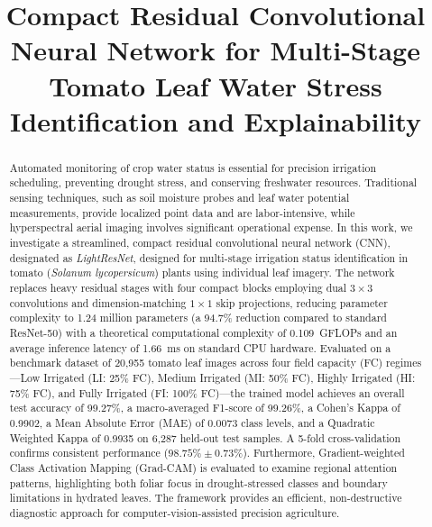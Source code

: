 \documentclass[conference]{IEEEtran}
\begin{document}
\title{Compact Residual Convolutional Neural Network for Multi-Stage Tomato Leaf Water Stress Identification and Explainability}

\author{
}

\maketitle

\begin{abstract}
Automated monitoring of crop water status is essential for precision irrigation scheduling, preventing drought stress, and conserving freshwater resources. Traditional sensing techniques, such as soil moisture probes and leaf water potential measurements, provide localized point data and are labor-intensive, while hyperspectral aerial imaging involves significant operational expense. In this work, we investigate a streamlined, compact residual convolutional neural network (CNN), designated as \textit{LightResNet}, designed for multi-stage irrigation status identification in tomato (\textit{Solanum lycopersicum}) plants using individual leaf imagery. The network replaces heavy residual stages with four compact blocks employing dual $3 \times 3$ convolutions and dimension-matching $1 \times 1$ skip projections, reducing parameter complexity to 1.24 million parameters (a 94.7\% reduction compared to standard ResNet-50) with a theoretical computational complexity of 0.109~GFLOPs and an average inference latency of 1.66~ms on standard CPU hardware. Evaluated on a benchmark dataset of 20,955 tomato leaf images across four field capacity (FC) regimes---Low Irrigated (LI: 25\% FC), Medium Irrigated (MI: 50\% FC), Highly Irrigated (HI: 75\% FC), and Fully Irrigated (FI: 100\% FC)---the trained model achieves an overall test accuracy of 99.27\%, a macro-averaged F1-score of 99.26\%, a Cohen's Kappa of 0.9902, a Mean Absolute Error (MAE) of 0.0073 class levels, and a Quadratic Weighted Kappa of 0.9935 on 6,287 held-out test samples. A 5-fold cross-validation confirms consistent performance ($98.75\% \pm 0.73\%$). Furthermore, Gradient-weighted Class Activation Mapping (Grad-CAM) is evaluated to examine regional attention patterns, highlighting both foliar focus in drought-stressed classes and boundary limitations in hydrated leaves. The framework provides an efficient, non-destructive diagnostic approach for computer-vision-assisted precision agriculture.
\end{abstract}
\end{document}
